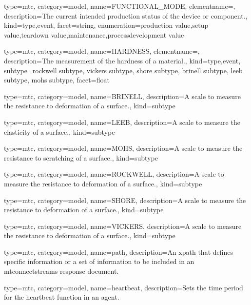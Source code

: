 {
  type=mtc,
  category=model,
  name={FUNCTIONAL\_MODE},
  elementname=,
  description={The current intended production status of the device or component.},
  kind={type,event},
  facet={\gls{string}},
  enumeration={\gls{production value},\gls{setup value},\gls{teardown value},\gls{maintenance},\gls{processdevelopment value}}
}


{
  type=mtc,
  category=model,
  name={HARDNESS},
  elementname=,
  description={The measurement of the hardness of a material.},
  kind={type,event},
  subtype={\gls{rockwell subtype}, \gls{vickers subtype}, \gls{shore subtype}, \gls{brinell subtype}, \gls{leeb subtype}, \gls{mohs subtype}},
  facet={\gls{float}}
}


{
  type=mtc,
  category=model,
  name={BRINELL},
  description={A scale to measure the resistance to deformation of a surface.},
  kind={subtype}
}


{
  type=mtc,
  category=model,
  name={LEEB},
  description={A scale to measure the elasticity of a surface.},
  kind={subtype}
}


{
  type=mtc,
  category=model,
  name={MOHS},
  description={A scale to measure the resistance to scratching of a surface.},
  kind={subtype}
}


{
  type=mtc,
  category=model,
  name={ROCKWELL},
  description={A scale to measure the resistance to deformation of a surface.},
  kind={subtype}
}


{
  type=mtc,
  category=model,
  name={SHORE},
  description={A scale to measure the resistance to deformation of a surface.},
  kind={subtype}
}


{
  type=mtc,
  category=model,
  name={VICKERS},
  description={A scale to measure the resistance to deformation of a surface.},
  kind={subtype}
}

{
  type=mtc,
  category=model,
  name={path},
  description={An \gls{xpath} that defines specific information or a set of information to be included in an \gls{mtconnectstreams response document}.}
}

{
  type=mtc,
  category=model,
  name={heartbeat},
  description={Sets the time period for the heartbeat function in an \gls{agent}.}
}



